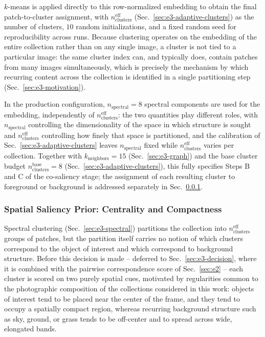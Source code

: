 $k$-means is applied directly to this row-normalized embedding to obtain the final patch-to-cluster assignment, with $n_{\text{clusters}}^{\text{eff}}$ (Sec.~\ref{sec:e3-adaptive-clusters}) as the number of clusters, $10$ random initializations, and a fixed random seed for reproducibility across runs. Because clustering operates on the embedding of the entire collection rather than on any single image, a cluster is not tied to a particular image: the same cluster index can, and typically does, contain patches from many images simultaneously, which is precisely the mechanism by which recurring content across the collection is identified in a single partitioning step (Sec.~\ref{sec:e3-motivation}).

In the production configuration, $n_{\text{spectral}}=8$ spectral components are used for the embedding, independently of $n_{\text{clusters}}^{\text{eff}}$: the two quantities play different roles, with $n_{\text{spectral}}$ controlling the dimensionality of the space in which structure is sought and $n_{\text{clusters}}^{\text{eff}}$ controlling how finely that space is partitioned, and the calibration of Sec.~\ref{sec:e3-adaptive-clusters} leaves $n_{\text{spectral}}$ fixed while $n_{\text{clusters}}^{\text{eff}}$ varies per collection. Together with $k_{\text{neighbors}}=15$ (Sec.~\ref{sec:e3-graph}) and the base cluster budget $n_{\text{clusters}}^{\text{base}}=8$ (Sec.~\ref{sec:e3-adaptive-clusters}), this fully specifies Steps B and C of the co-saliency stage; the assignment of each resulting cluster to foreground or background is addressed separately in Sec.~\ref{sec:e3-saliency}.

\subsubsection{Spatial Saliency Prior: Centrality and Compactness}
\label{sec:e3-saliency}

Spectral clustering (Sec.~\ref{sec:e3-spectral}) partitions the collection into $n_{\text{clusters}}^{\text{eff}}$ groups of patches, but the partition itself carries no notion of which clusters correspond to the object of interest and which correspond to background structure. Before this decision is made -- deferred to Sec.~\ref{sec:e3-decision}, where it is combined with the pairwise correspondence score of Sec.~\ref{sec:e2} -- each cluster is scored on two purely spatial cues, motivated by regularities common to the photographic composition of the collections considered in this work: objects of interest tend to be placed near the center of the frame, and they tend to occupy a spatially compact region, whereas recurring background structure such as sky, ground, or grass tends to be off-center and to spread across wide, elongated bands.

